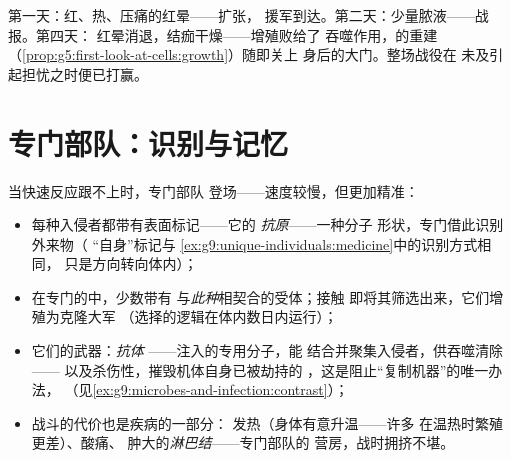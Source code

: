 \begin{example}[解读愈合中的伤口]\label{ex:g9:immune-defenses:cut}
第一天：红、热、压痛的红晕——扩张，
援军到达。第二天：少量脓液——战报。第四天：
红晕消退，结痂干燥——增殖败给了
吞噬作用，的重建
（\cref{prop:g5:first-look-at-cells:growth}）随即关上
身后的大门。整场战役在
未及引起担忧之时便已打赢。
\end{example}

\section{专门部队：识别与记忆}

\begin{proposition}[特异性免疫应答]\label{prop:g9:immune-defenses:specific}
当快速反应跟不上时，专门部队
登场——速度较慢，但更加精准：
\begin{itemize}
  \item 每种入侵者都带有表面标记——它的
        \emph{抗原}——一种分子
        形状，专门借此识别外来物（
        “自身”标记与
        \cref{ex:g9:unique-individuals:medicine}中的识别方式相同，
        只是方向转向体内）；
  \item 在专门的中，少数带有
        与\emph{此种}相契合的受体；接触
        即将其筛选出来，它们增殖为克隆大军
        （选择的逻辑在体内数日内运行）；
  \item 它们的武器：\emph{抗体}
——注入的专用分子，能
        结合并聚集入侵者，供吞噬清除——
        以及杀伤性，摧毁机体自身已被劫持的
        ，这是阻止“复制机器”的唯一办法，
        （见\cref{ex:g9:microbes-and-infection:contrast}）；
  \item 战斗的代价也是疾病的一部分：
        发热（身体有意升温——许多
        在温热时繁殖更差）、酸痛、
        肿大的\emph{淋巴结}——专门部队的
        营房，战时拥挤不堪。
\end{itemize}
\end{proposition}
\admitted

